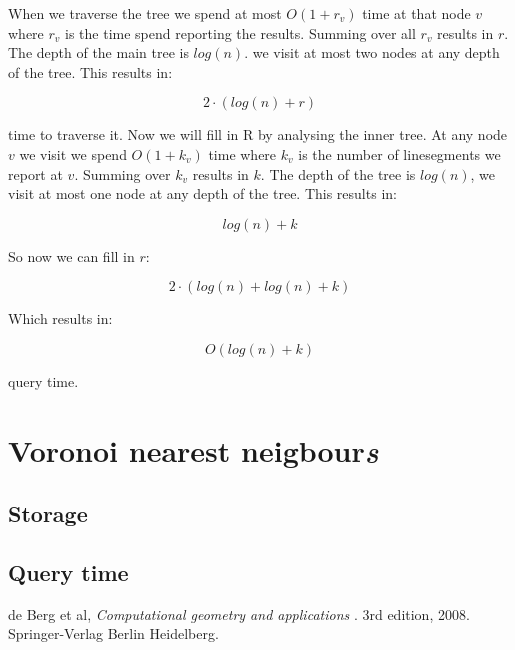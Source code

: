 \documentclass{article}
\begin{document}
When we traverse the tree we spend at most $O(1+r_v)$ time at
that node $v$ where $r_v$ is the time spend reporting the results.
Summing over all $r_v$ results in $r$. The depth of the main tree
is $log(n)$. we visit at most two nodes at any depth of the tree.
This results in:

\[ 2\cdot (log(n)+r)\]

time to traverse it. Now we will fill in R by analysing the
inner tree. At any node $v$ we visit we spend $O(1+k_v)$ time where
$k_v$ is the number of linesegments we report at $v$. Summing
over $k_v$ results in $k$. The depth of the tree is $log(n)$,
we visit at most one node at any depth of the tree. This results in:

\[ log(n)+k\]

So now we can fill in $r$:

\[ 2\cdot (log(n)+log(n)+k)\]

Which results in:

\[ O(log(n)+k) \]

query time.
\section{Voronoi nearest neigbour\emph{s}}
\subsection{Storage}
\subsection{Query time}

\begin{thebibliography}{9}
de Berg et al,
\textit{Computational geometry and applications }.
3rd edition, 2008. Springer-Verlag Berlin Heidelberg.
\end{thebibliography}
\end{document}
